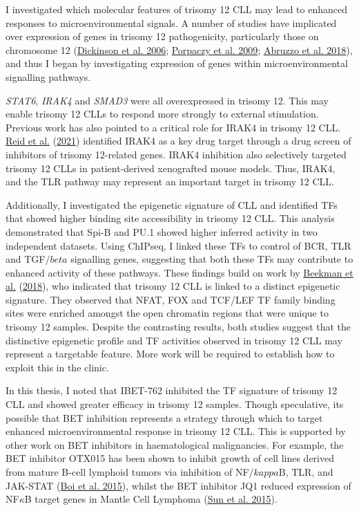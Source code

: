 \documentclass[11pt, a4paper, twosided]{book}
\begin{document}
I investigated which molecular features of trisomy 12 CLL may lead to enhanced responses to microenvironmental signals. A number of studies have implicated over expression of genes in trisomy 12 pathogenicity, particularly those on chromosome 12 (\protect\hyperlink{ref-Dickinson2006}{Dickinson et al. 2006}; \protect\hyperlink{ref-Porpaczy2009}{Porpaczy et al. 2009}; \protect\hyperlink{ref-Abruzzo2018}{Abruzzo et al. 2018}), and thus I began by investigating expression of genes within microenvironmental signalling pathways.

\emph{STAT6}, \emph{IRAK4} and \emph{SMAD3} were all overexpressed in trisomy 12. This may enable trisomy 12 CLLs to respond more strongly to external stimulation. Previous work has also pointed to a critical role for IRAK4 in trisomy 12 CLL. \protect\hyperlink{ref-Reid2021}{Reid et al.} (\protect\hyperlink{ref-Reid2021}{2021}) identified IRAK4 as a key drug target through a drug screen of inhibitors of trisomy 12-related genes. IRAK4 inhibition also selectively targeted trisomy 12 CLLs in patient-derived xenografted mouse models. Thus, IRAK4, and the TLR pathway may represent an important target in trisomy 12 CLL.

Additionally, I investigated the epigenetic signature of CLL and identified TFs that showed higher binding site accessibility in trisomy 12 CLL. This analysis demonstrated that Spi-B and PU.1 showed higher inferred activity in two independent datasets. Using ChIPseq, I linked these TFs to control of BCR, TLR and TGF\(/beta\) signalling genes, suggesting that both these TFs may contribute to enhanced activity of these pathways. These findings build on work by \protect\hyperlink{ref-Beekman2018}{Beekman et al.} (\protect\hyperlink{ref-Beekman2018}{2018}), who indicated that trisomy 12 CLL is linked to a distinct epigenetic signature. They observed that NFAT, FOX and TCF/LEF TF family binding sites were enriched amongst the open chromatin regions that were unique to trisomy 12 samples. Despite the contrasting results, both studies suggest that the distinctive epigenetic profile and TF activities observed in trisomy 12 CLL may represent a targetable feature. More work will be required to establish how to exploit this in the clinic.

In this thesis, I noted that IBET-762 inhibited the TF signature of trisomy 12 CLL and showed greater efficacy in trisomy 12 samples. Though speculative, its possible that BET inhibition represents a strategy through which to target enhanced microenvironmental response in trisomy 12 CLL. This is supported by other work on BET inhibitors in haematological malignancies. For example, the BET inhibitor OTX015 has been shown to inhibit growth of cell lines derived from mature B-cell lymphoid tumors via inhibition of NF\(/kappa\)B, TLR, and JAK-STAT (\protect\hyperlink{ref-Boi2015}{Boi et al. 2015}), whilst the BET inhibitor JQ1 reduced expression of NF\(\kappa\)B target genes in Mantle Cell Lymphoma (\protect\hyperlink{ref-Sun2015}{Sun et al. 2015}).
\end{document}
